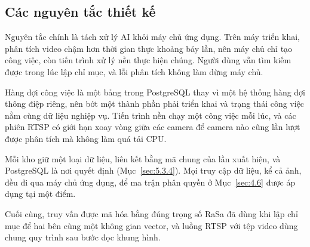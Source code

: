 \subsection{Các nguyên tắc thiết kế}
\label{sec:5.1.3}

Nguyên tắc chính là tách xử lý AI khỏi máy chủ ứng dụng. Trên máy triển khai, phân tích video chậm hơn thời gian thực khoảng bảy lần, nên máy chủ chỉ tạo công việc, còn tiến trình xử lý nền thực hiện chúng. Người dùng vẫn tìm kiếm được trong lúc lập chỉ mục, và lỗi phân tích không làm dừng máy chủ.

Hàng đợi công việc là một bảng trong PostgreSQL thay vì một hệ thống hàng đợi thông điệp riêng, nên bớt một thành phần phải triển khai và trạng thái công việc nằm cùng dữ liệu nghiệp vụ. Tiến trình nền chạy một công việc mỗi lúc, và các phiên RTSP có giới hạn xoay vòng giữa các camera để camera nào cũng lần lượt được phân tích mà không làm quá tải CPU.

Mỗi kho giữ một loại dữ liệu, liên kết bằng mã chung của lần xuất hiện, và PostgreSQL là nơi quyết định (Mục~\ref{sec:5.3.4}). Mọi truy cập dữ liệu, kể cả ảnh, đều đi qua máy chủ ứng dụng, để ma trận phân quyền ở Mục~\ref{sec:4.6} được áp dụng tại một điểm.

Cuối cùng, truy vấn được mã hóa bằng đúng trọng số RaSa đã dùng khi lập chỉ mục để hai bên cùng một không gian vector, và luồng RTSP với tệp video dùng chung quy trình sau bước đọc khung hình.
